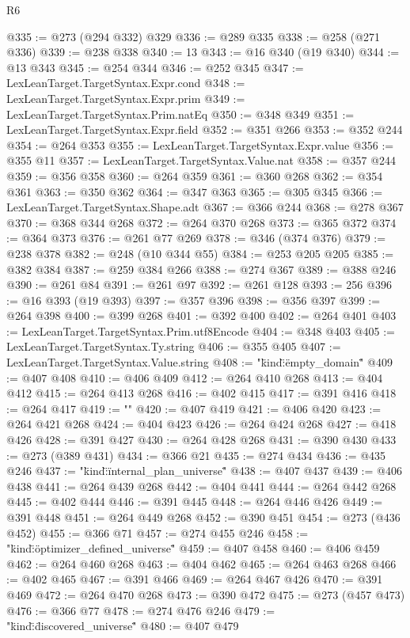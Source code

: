 \begin{lexlean}{R6}
\begin{coremodule}
@335 := @273 (@294 @332) @329
@336 := @289 @335
@338 := @258 (@271 @336)
@339 := @238 @338
@340 := 13
@343 := @16 @340 (@19 @340)
@344 := @13 @343
@345 := @254 @344
@346 := @252 @345
@347 := LexLeanTarget.TargetSyntax.Expr.cond
@348 := LexLeanTarget.TargetSyntax.Expr.prim
@349 := LexLeanTarget.TargetSyntax.Prim.natEq
@350 := @348 @349
@351 := LexLeanTarget.TargetSyntax.Expr.field
@352 := @351 @266
@353 := @352 @244
@354 := @264 @353
@355 := LexLeanTarget.TargetSyntax.Expr.value
@356 := @355 @11
@357 := LexLeanTarget.TargetSyntax.Value.nat
@358 := @357 @244
@359 := @356 @358
@360 := @264 @359
@361 := @360 @268
@362 := @354 @361
@363 := @350 @362
@364 := @347 @363
@365 := @305 @345
@366 := LexLeanTarget.TargetSyntax.Shape.adt
@367 := @366 @244
@368 := @278 @367
@370 := @368 @344 @268
@372 := @264 @370 @268
@373 := @365 @372
@374 := @364 @373
@376 := @261 @77 @269
@378 := @346 (@374 @376)
@379 := @238 @378
@382 := @248 (@10 @344 @55)
@384 := @253 @205 @205
@385 := @382 @384
@387 := @259 @384 @266
@388 := @274 @367
@389 := @388 @246
@390 := @261 @84
@391 := @261 @97
@392 := @261 @128
@393 := 256
@396 := @16 @393 (@19 @393)
@397 := @357 @396
@398 := @356 @397
@399 := @264 @398
@400 := @399 @268
@401 := @392 @400
@402 := @264 @401
@403 := LexLeanTarget.TargetSyntax.Prim.utf8Encode
@404 := @348 @403
@405 := LexLeanTarget.TargetSyntax.Ty.string
@406 := @355 @405
@407 := LexLeanTarget.TargetSyntax.Value.string
@408 := "{\"kind\":\"empty_domain\""
@409 := @407 @408
@410 := @406 @409
@412 := @264 @410 @268
@413 := @404 @412
@415 := @264 @413 @268
@416 := @402 @415
@417 := @391 @416
@418 := @264 @417
@419 := "}"
@420 := @407 @419
@421 := @406 @420
@423 := @264 @421 @268
@424 := @404 @423
@426 := @264 @424 @268
@427 := @418 @426
@428 := @391 @427
@430 := @264 @428 @268
@431 := @390 @430
@433 := @273 (@389 @431)
@434 := @366 @21
@435 := @274 @434
@436 := @435 @246
@437 := "{\"kind\":\"internal_plan_universe\""
@438 := @407 @437
@439 := @406 @438
@441 := @264 @439 @268
@442 := @404 @441
@444 := @264 @442 @268
@445 := @402 @444
@446 := @391 @445
@448 := @264 @446 @426
@449 := @391 @448
@451 := @264 @449 @268
@452 := @390 @451
@454 := @273 (@436 @452)
@455 := @366 @71
@457 := @274 @455 @246
@458 := "{\"kind\":\"optimizer_defined_universe\""
@459 := @407 @458
@460 := @406 @459
@462 := @264 @460 @268
@463 := @404 @462
@465 := @264 @463 @268
@466 := @402 @465
@467 := @391 @466
@469 := @264 @467 @426
@470 := @391 @469
@472 := @264 @470 @268
@473 := @390 @472
@475 := @273 (@457 @473)
@476 := @366 @77
@478 := @274 @476 @246
@479 := "{\"kind\":\"discovered_universe\""
@480 := @407 @479
}}}
\end{coremodule}
\end{lexlean}
